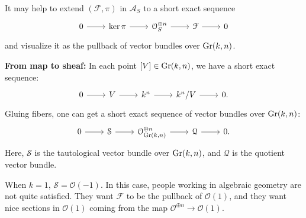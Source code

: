 \begin{remark}
It may help to extend $(\mathcal{F},\pi)$ in $\mathcal{A}_S$ to a short exact sequence
\[\begin{tikzcd}[column sep=2.25em]
	0 & {\ker \pi} & {\mathcal{O}_S^{\oplus n}} & {\mathcal{F}} & 0
	\arrow[from=1-1, to=1-2]
	\arrow[from=1-2, to=1-3]
	\arrow[from=1-3, to=1-4]
	\arrow[from=1-4, to=1-5]
\end{tikzcd}\]
and visualize it as the pullback of vector bundles over $\operatorname{Gr}(k,n)$.

\textbf{From map to sheaf:}
In each point $[V] \in \operatorname{Gr}(k,n)$, we have a short exact sequence:
\[\begin{tikzcd}[column sep=2.25em]
	0 & V & {k^n} & {k^n/V} & 0. 
	\arrow[from=1-1, to=1-2]
	\arrow[from=1-2, to=1-3]
	\arrow[from=1-3, to=1-4]
	\arrow[from=1-4, to=1-5]
\end{tikzcd}\]
Gluing fibers, one can get a short exact sequence of vector bundles over $\operatorname{Gr}(k,n)$:
\begin{equation}\label{eq:canonical_ses_over_Gr}
\begin{tikzcd}[column sep=2.25em]
	0 & {\mathcal{S}} & {\mathcal{O}_{\Gr(k,n)}^{\oplus n}} & {\mathcal{Q}} & 0.
	\arrow[from=1-1, to=1-2]
	\arrow[from=1-2, to=1-3]
	\arrow[from=1-3, to=1-4]
	\arrow[from=1-4, to=1-5]
\end{tikzcd}
\end{equation}
Here, $\mathcal{S}$ is the tautological vector bundle over $\operatorname{Gr}(k,n)$, and ${\mathcal{Q}}$ is the quotient vector bundle. 

When $k=1$, $\mathcal{S} = \mathcal{O}(-1)$. In this case, people working in algebraic geometry are not quite satisfied. They want $\mathcal{F}$ to be the pullback of $\mathcal{O}(1)$, and they want nice sections in $\mathcal{O}(1)$ coming from the map $\mathcal{O}^{\oplus n} \longrightarrow \mathcal{O}(1)$.


\end{remark}
